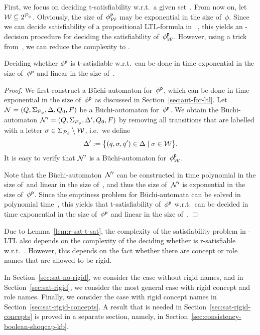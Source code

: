 First, we focus on deciding t-satisfiability w.r.t.\ a given set~\Wmc.
%
From now on, let $\mathcal{W}\subseteq 2^{\mathcal{P}_\phi}$.  Obviously, the size
of~$\phi^\mathsf{p}_\mathcal{W}$ may be exponential in the size of~$\phi$.  Since we can
decide satisfiability of a propositional LTL-formula in
\PSpace~\cite{SiCl-JACM85,LiPZ-CLP85}, this yields an \ExpSpace-decision
procedure for deciding the satisfiability of~$\phi^\mathsf{p}_\mathcal{W}$.  However, using a
trick from~\cite{BaGL-ToCL12}, we can reduce the complexity to \ExpTime.

\begin{lemma}\label{lem:t-sat}
    Deciding whether $\phi^\mathsf{p}$ is t-satisfiable w.r.t.~\Wmc can be done in
    time exponential in the size of~$\phi^\mathsf{p}$ and linear in the size of~\Wmc.
\end{lemma}

\begin{proof}
    We first construct a Büchi-automaton for~$\phi^\mathsf{p}$, which can be done in
    time exponential in the size of~$\phi^\mathsf{p}$ as discussed in
    Section~\ref{sec:aut-for-ltl}.  Let
    $\mathcal{N}=(Q,\Sigma_{\mathcal{P}_\phi},\Delta,Q_0,F)$ be a Büchi-automaton
    for~$\phi^\mathsf{p}$.  We obtain the Büchi-automaton
    $\mathcal{N}'=(Q,\Sigma_{\mathcal{P}_\phi},\Delta',Q_0,F)$ by removing all transitions
    that are labelled with a letter $\sigma\in\Sigma_{\mathcal{P}_\phi}\setminus\mathcal{W}$,
    i.e.~we define
    \[\Delta':=\bigl\{(q,\sigma,q')\in\Delta\mid\sigma\in\mathcal{W}\bigr\}.\]
    It is easy to verify that $\mathcal{N}'$ is a Büchi-automaton for~$\phi^\mathsf{p}_\mathcal{W}$.

    Note that the Büchi-automaton~$\mathcal{N}'$ can be constructed in time polynomial
    in the size of~\Nmc and linear in the size of~\Wmc, and thus the size
    of~$\mathcal{N}'$ is exponential in the size of~$\phi^\mathsf{p}$.  Since the emptiness
    problem for Büchi-automata can be solved in polynomial
    time~\cite{VaWo-IC94}, this yields that t-satisfiability of~$\phi^\mathsf{p}$
    w.r.t.~\Wmc can be decided in time exponential in the size of~$\phi^\mathsf{p}$
    and linear in the size of~\Wmc.
\end{proof}

\noindent
Due to Lemma~\ref{lem:r-sat-t-sat}, the complexity of the satisfiability problem
in \SHOQ-LTL also depends on the complexity of the deciding whether \Wmc is
r-satisfiable w.r.t.~\Rmc.  However, this depends on the fact whether there are
concept or role names that are allowed to be rigid.

In Section~\ref{sec:sat-no-rigid}, we consider the case without rigid names, and
in Section~\ref{sec:sat-rigid}, we consider the most general case with rigid
concept and role names.  Finally, we consider the case with rigid concept names
in Section~\ref{sec:sat-rigid-concepts}.  A result that is needed in
Section~\ref{sec:sat-rigid-concepts} is proved in a separate section, namely, in
Section~\ref{sec:consistency-boolean-shoqcap-kb}.


